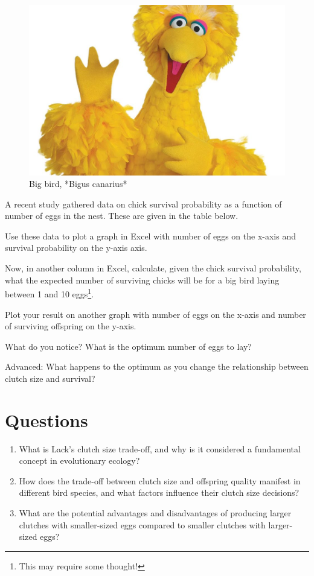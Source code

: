 \documentclass[
  a4paper]{book}
\providecommand{\tightlist}{%
  \setlength{\itemsep}{0pt}\setlength{\parskip}{0pt}}
\begin{document}
\begin{figure}

{\centering \includegraphics[width=0.5\linewidth]{images/bigbird} 

}

\caption{Big bird, *Bigus canarius*}\label{fig:bigbird}
\end{figure}

A recent study gathered data on chick survival probability as a function of number of eggs in the nest. These are given in the table below.

Use these data to plot a graph in Excel with number of eggs on the x-axis and survival probability on the y-axis axis.

Now, in another column in Excel, calculate, given the chick survival probability, what the expected number of surviving chicks will be for a big bird laying between 1 and 10 eggs\footnote{This may require some thought!}.

Plot your result on another graph with number of eggs on the x-axis and number of surviving offspring on the y-axis.

What do you notice? What is the optimum number of eggs to lay?

Advanced: What happens to the optimum as you change the relationship between clutch size and survival?

\section{Questions}\label{questions-9}

\begin{enumerate}
\def\labelenumi{\arabic{enumi}.}
\tightlist
\item
  What is Lack's clutch size trade-off, and why is it considered a fundamental concept in evolutionary ecology?
\item
  How does the trade-off between clutch size and offspring quality manifest in different bird species, and what factors influence their clutch size decisions?
\item
  What are the potential advantages and disadvantages of producing larger clutches with smaller-sized eggs compared to smaller clutches with larger-sized eggs?
\end{enumerate}
\end{document}

